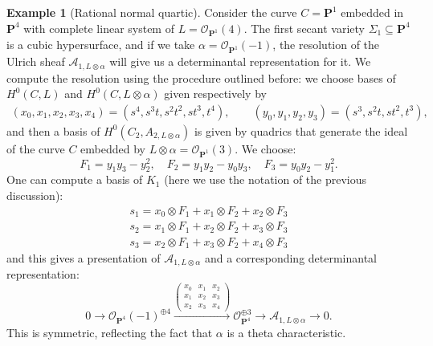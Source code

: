 \documentclass[12pt]{amsart}
\newcounter{thmcounter}
\numberwithin{equation}{section}
\numberwithin{thmcounter}{section}
\theoremstyle{definition}
\newtheorem{example}[thmcounter]{Example}
\theoremstyle{claim}
\newcommand{\nP}{\mathbf{P}}
\newcommand{\sA}{\mathscr{A}}
\newcommand{\sO}{\mathscr{O}}
\begin{document}
\begin{example}[Rational normal quartic]
	Consider the curve $C=\nP^1$ embedded in $\nP^4$ with complete linear system of $L=\sO_{\nP^1}(4)$. The first secant variety $\Sigma_1 \subseteq \nP^4$ is a cubic hypersurface,  and if we take  $\alpha=\sO_{\nP^1}(-1)$, the resolution of the Ulrich sheaf $\mathscr{A}_{1,L\otimes \alpha}$ will give us a determinantal representation for it. We compute the resolution using the procedure outlined before: we choose bases of $H^0(C,L)$ and $H^0(C,L\otimes \alpha)$ given respectively by
	\begin{align*}
		(x_0,x_1,x_2,x_3,x_4) = (s^4,s^3t,s^2t^2,st^3,t^4), \qquad
		(y_0,y_1,y_2,y_3) = (s^3,s^2t,st^2,t^3),
	\end{align*}
	and then a basis of $H^0(C_2,A_{2,L\otimes \alpha})$ is given by quadrics that generate the ideal of the curve $C$ embedded by $L\otimes \alpha = \sO_{\nP^1}(3)$. We choose:
	\[ F_1 = y_1y_3-y_2^2, \quad F_2 = y_1y_2-y_0y_3, \quad F_3 = y_0y_2-y_1^2. \]
	One can compute a basis of $K_1$ (here we use the notation of the previous discussion):
	\begin{align*}
		s_1 = x_0 \otimes F_1 + x_1\otimes F_2 + x_2 \otimes F_3 \\
		s_2  = x_1 \otimes F_1 + x_2\otimes F_2 + x_3 \otimes F_3 \\
		s_3  = x_2 \otimes F_1 + x_3\otimes F_2 + x_4 \otimes F_3
	\end{align*}
	and this gives a presentation of $\mathscr{A}_{1,L\otimes \alpha}$ and a corresponding determinantal representation:
	\[ 0 \longrightarrow \sO_{\nP^4}(-1)^{\oplus 4} \xrightarrow{ \begin{pmatrix} x_0 & x_1 & x_2 \\ x_1 & x_2 & x_3 \\ x_2 & x_3 & x_4 \end{pmatrix}}  \sO_{\nP^4}^{\oplus 3} \longrightarrow \sA_{1,L\otimes \alpha} \longrightarrow 0. \]
	This is symmetric, reflecting the fact that $\alpha$ is a theta characteristic.
\end{example}
\end{document}
